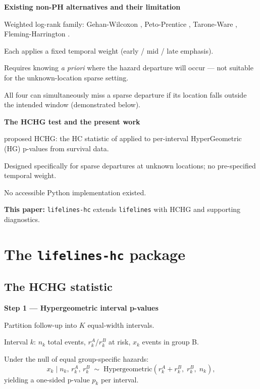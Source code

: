 \documentclass[unnumsec,webpdf,contemporary,large]{oup-authoring-template}
\let\origitemize\itemize
\let\origenditemize\enditemize
\renewenvironment{itemize}{%
  \origitemize
  \setlength{\itemsep}{1pt}%
  \setlength{\parskip}{0pt}%
  \setlength{\topsep}{3pt}%
}{\origenditemize}
\begin{document}
\textbf{Existing non-PH alternatives and their limitation}
\begin{itemize}
  \item Weighted log-rank family: Gehan-Wilcoxon \citep{gehan1965},
        Peto-Prentice \citep{peto1972}, Tarone-Ware \citep{taroneware1977},
        Fleming-Harrington \citep{flemingharrington1991}.
  \item Each applies a fixed temporal weight (early / mid / late emphasis).
  \item Requires knowing \emph{a priori} where the hazard departure will
        occur — not suitable for the unknown-location sparse setting.
  \item All four can simultaneously miss a sparse departure if its location
        falls outside the intended window (demonstrated below).
\end{itemize}

\textbf{The HCHG test and the present work}
\begin{itemize}
  \item \citet{kipnis_biometrika} proposed HCHG: the HC statistic of
        \citet{donoho2004} applied to per-interval HyperGeometric (HG)
        p-values from survival data.
  \item Designed specifically for sparse departures at unknown locations;
        no pre-specified temporal weight.
  \item No accessible Python implementation existed.
  \item \textbf{This paper:} \texttt{lifelines-hc} extends
        \texttt{lifelines} \citep{davidsonpilon2019} with HCHG and
        supporting diagnostics.
\end{itemize}


\section{The \texttt{lifelines-hc} package}

\subsection*{The HCHG statistic}

\textbf{Step 1 — Hypergeometric interval p-values}
\begin{itemize}
  \item Partition follow-up into $K$ equal-width intervals.
  \item Interval $k$: $n_k$ total events, $r_k^A$/$r_k^B$ at risk,
        $x_k$ events in group B.
  \item Under the null of equal group-specific hazards:
\end{itemize}
%
\begin{equation}\label{eq:hypergeom}
  x_k \;\Big|\; n_k,\, r_k^A,\, r_k^B
  \;\sim\;
  \mathrm{Hypergeometric}\!\left(r_k^A + r_k^B,\; r_k^B,\; n_k\right),
\end{equation}
%
yielding a one-sided p-value $p_k$ per interval.
\end{document}
